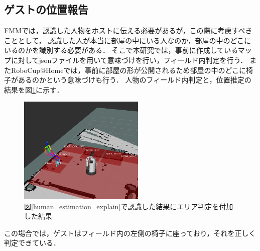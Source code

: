 \documentclass[a4j]{jarticle}
\begin{document}
\subsection{ゲストの位置報告}
FMMでは，認識した人物をホストに伝える必要があるが，この際に考慮すべきこととして，
認識した人が本当に部屋の中にいる人なのか，部屋の中のどこにいるのかを識別する必要がある．
そこで本研究では，事前に作成しているマップに対してjsonファイルを用いて意味づけを行い，フィールド内判定を行う．
またRoboCup@Homeでは，事前に部屋の形が公開されるため部屋の中のどこに椅子があるのかという意味づけも行う．
人物のフィールド内判定と，位置推定の結果を図\ref{human_where_map}に示す．
\begin{figure}[ht]
  \centering
  \includegraphics[width=6cm]{images/human_recognition/ss_5_trim.png}
  \caption{図\ref{human_estimation_explain}で認識した結果にエリア判定を付加した結果}
  \label{human_where_map}
\end{figure}
この場合では，ゲストはフィールド内の左側の椅子に座っており，それを正しく判定できている．

\end{document}
